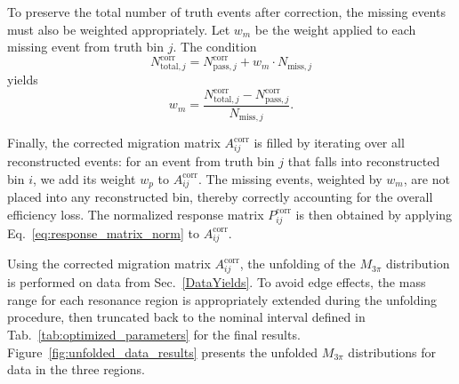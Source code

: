 To preserve the total number of truth events after correction, the missing events must also be weighted appropriately. Let $w_m$ be the weight applied to each missing event from truth bin $j$. The condition
\[
N_{\text{total},j}^{\text{corr}} = N_{\text{pass},j}^{\text{corr}} + w_m \cdot N_{\text{miss},j}
\]
yields
\[
w_m = \frac{N_{\text{total},j}^{\text{corr}} - N_{\text{pass},j}^{\text{corr}}}{N_{\text{miss},j}}.
\]

Finally, the corrected migration matrix $A_{ij}^{\text{corr}}$ is filled by iterating over all reconstructed events: for an event from truth bin $j$ that falls into reconstructed bin $i$, we add its weight $w_p$ to $A_{ij}^{\text{corr}}$. The missing events, weighted by $w_m$, are not placed into any reconstructed bin, thereby correctly accounting for the overall efficiency loss. The normalized response matrix $P_{ij}^{\text{corr}}$ is then obtained by applying Eq.~\eqref{eq:response_matrix_norm} to $A_{ij}^{\text{corr}}$.

Using the corrected migration matrix $A_{ij}^{\text{corr}}$, the unfolding of the $M_{3\pi}$ distribution is performed on data from Sec.~\ref{DataYields}. To avoid edge effects, the mass range for each resonance region is appropriately extended during the unfolding procedure, then truncated back to the nominal interval defined in Tab.~\ref{tab:optimized_parameters} for the final results. Figure~\ref{fig:unfolded_data_results} presents the unfolded $M_{3\pi}$ distributions for data in the three regions.

